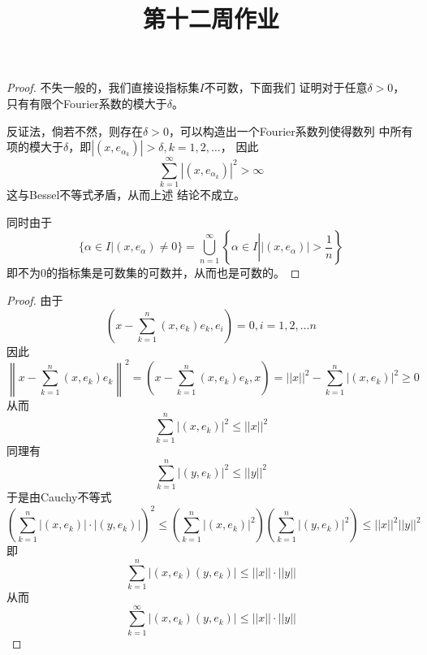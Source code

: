 \documentclass[cn]{homework}
\title{第十二周作业}
\begin{document}
    \maketitle

    \problem

    \problem

    \problem
    \begin{proof}
        不失一般的，我们直接设指标集$I$不可数，下面我们
        证明对于任意$\delta>0$，只有有限个Fourier系数的模大于$\delta$。

        反证法，倘若不然，则存在$\delta>0$，可以构造出一个Fourier系数列使得数列
        中所有项的模大于$\delta$，即$|(x,e_{\alpha_k})|>\delta,k=1,2,\ldots$，
        因此
        \[\sum_{k=1}^\infty|(x,e_{\alpha_k})|^2>\infty\]
        这与Bessel不等式矛盾，从而上述
        结论不成立。

        同时由于
        \[\{\alpha\in I|(x,e_\alpha)\neq 0\}
        =\bigcup_{n=1}^\infty\left\{\alpha\in I\left||(x,e_\alpha)|>\frac{1}{n}\right.\right\}\]
        即不为0的指标集是可数集的可数并，从而也是可数的。
    \end{proof}

    \problem
    \begin{proof}
        由于
        \[\left(x-\sum_{k=1}^n(x,e_k)e_k,e_i\right)=0,i=1,2,\ldots n\]
        因此
        \[\left\|x-\sum_{k=1}^n(x,e_k)e_k\right\|^2
        =\left(x-\sum_{k=1}^n(x,e_k)e_k,x\right)
        =||x||^2-\sum_{k=1}^n|(x,e_k)|^2\geq 0\]
        从而
        \[\sum_{k=1}^n|(x,e_k)|^2\leq ||x||^2\]
        同理有
        \[\sum_{k=1}^n|(y,e_k)|^2\leq ||y||^2\]
        于是由Cauchy不等式
        \[\left(\sum_{k=1}^n|(x,e_k)|\cdot|(y,e_k)|\right)^2
        \leq
        \left(\sum_{k=1}^n|(x,e_k)|^2\right)
        \left(\sum_{k=1}^n|(y,e_k)|^2\right)
        \leq ||x||^2||y||^2\]
        即
        \[\sum_{k=1}^n|(x,e_k)(y,e_k)|\leq
        ||x||\cdot||y||\]
        从而
        \[\sum_{k=1}^\infty|(x,e_k)(y,e_k)|\leq ||x||\cdot||y||\]


    \end{proof}
\end{document}
